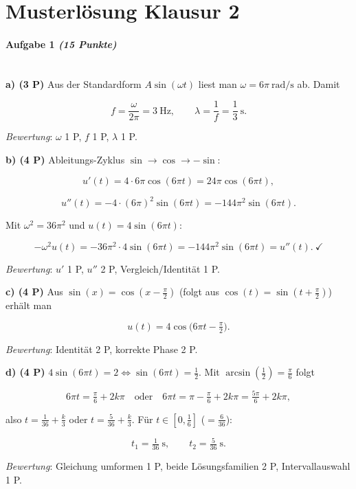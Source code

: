 \documentclass[11pt, a4paper]{article}
\begin{document}
\section{Musterlösung Klausur 2}

\paragraph{Aufgabe 1 \textit{(15 Punkte)}}\mbox{}\\[2pt]

\textbf{a) (3 P)} Aus der Standardform $A\sin(\omega t)$ liest man $\omega = 6\pi\ \text{rad/s}$ ab. Damit

\[
f = \frac{\omega}{2\pi} = 3\ \text{Hz}, \qquad \lambda = \frac{1}{f} = \frac{1}{3}\ \text{s}.
\]

\textit{Bewertung}: $\omega$ 1 P, $f$ 1 P, $\lambda$ 1 P.


\textbf{b) (4 P)} Ableitungs-Zyklus $\sin\to\cos\to-\sin$:

\[
u'(t) = 4\cdot 6\pi\cos(6\pi t) = 24\pi\cos(6\pi t),
\]

\[
u''(t) = -4\cdot(6\pi)^2\sin(6\pi t) = -144\pi^2\sin(6\pi t).
\]

Mit $\omega^2 = 36\pi^2$ und $u(t)=4\sin(6\pi t)$:

\[
-\omega^2 u(t) = -36\pi^2\cdot 4\sin(6\pi t) = -144\pi^2\sin(6\pi t) = u''(t).\ \checkmark
\]

\textit{Bewertung}: $u'$ 1 P, $u''$ 2 P, Vergleich/Identität 1 P.


\textbf{c) (4 P)} Aus $\sin(x) = \cos(x-\tfrac{\pi}{2})$ (folgt aus $\cos(t) = \sin(t+\tfrac{\pi}{2})$) erhält man

\[
u(t) = 4\cos\!\Big(6\pi t - \tfrac{\pi}{2}\Big).
\]

\textit{Bewertung}: Identität 2 P, korrekte Phase 2 P.


\textbf{d) (4 P)} $4\sin(6\pi t) = 2 \Longleftrightarrow \sin(6\pi t) = \tfrac{1}{2}$. Mit $\arcsin(\tfrac{1}{2}) = \tfrac{\pi}{6}$ folgt

\[
6\pi t = \tfrac{\pi}{6} + 2k\pi \quad\text{oder}\quad 6\pi t = \pi - \tfrac{\pi}{6} + 2k\pi = \tfrac{5\pi}{6} + 2k\pi,
\]

also $t = \tfrac{1}{36}+\tfrac{k}{3}$ oder $t = \tfrac{5}{36}+\tfrac{k}{3}$. Für $t\in[0,\tfrac{1}{6}]$ ($=\tfrac{6}{36}$):

\[
t_1 = \tfrac{1}{36}\ \text{s},\qquad t_2 = \tfrac{5}{36}\ \text{s}.
\]

\textit{Bewertung}: Gleichung umformen 1 P, beide Lösungsfamilien 2 P, Intervallauswahl 1 P.
\end{document}

